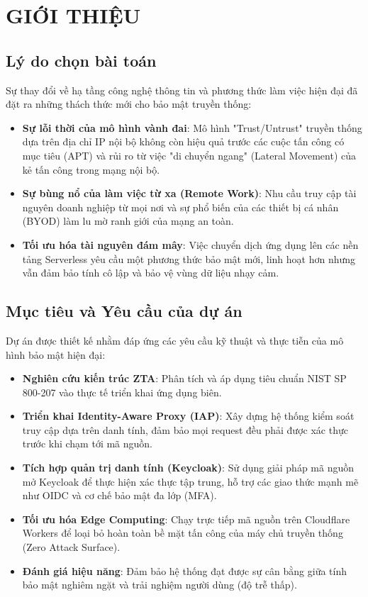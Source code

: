 
\section{GIỚI THIỆU}

\subsection{Lý do chọn bài toán}
Sự thay đổi về hạ tầng công nghệ thông tin và phương thức làm việc hiện đại đã đặt ra những thách thức mới cho bảo mật truyền thống:
\begin{itemize}
\item \textbf{Sự lỗi thời của mô hình vành đai}: Mô hình "Trust/Untrust" truyền thống dựa trên địa chỉ IP nội bộ không còn hiệu quả trước các cuộc tấn công có mục tiêu (APT) và rủi ro từ việc "di chuyển ngang" (Lateral Movement) của kẻ tấn công trong mạng nội bộ.
\item \textbf{Sự bùng nổ của làm việc từ xa (Remote Work)}: Nhu cầu truy cập tài nguyên doanh nghiệp từ mọi nơi và sự phổ biến của các thiết bị cá nhân (BYOD) làm lu mờ ranh giới của mạng an toàn.
\item \textbf{Tối ưu hóa tài nguyên đám mây}: Việc chuyển dịch ứng dụng lên các nền tảng Serverless yêu cầu một phương thức bảo mật mới, linh hoạt hơn nhưng vẫn đảm bảo tính cô lập và bảo vệ vùng dữ liệu nhạy cảm.
\end{itemize}

\subsection{Mục tiêu và Yêu cầu của dự án}
Dự án được thiết kế nhằm đáp ứng các yêu cầu kỹ thuật và thực tiễn của mô hình bảo mật hiện đại:
\begin{itemize}
\item \textbf{Nghiên cứu kiến trúc ZTA}: Phân tích và áp dụng tiêu chuẩn NIST SP 800-207 vào thực tế triển khai ứng dụng biên.
\item \textbf{Triển khai Identity-Aware Proxy (IAP)}: Xây dựng hệ thống kiểm soát truy cập dựa trên danh tính, đảm bảo mọi request đều phải được xác thực trước khi chạm tới mã nguồn.
\item \textbf{Tích hợp quản trị danh tính (Keycloak)}: Sử dụng giải pháp mã nguồn mở Keycloak để thực hiện xác thực tập trung, hỗ trợ các giao thức mạnh mẽ như OIDC và cơ chế bảo mật đa lớp (MFA).
\item \textbf{Tối ưu hóa Edge Computing}: Chạy trực tiếp mã nguồn trên Cloudflare Workers để loại bỏ hoàn toàn bề mặt tấn công của máy chủ truyền thống (Zero Attack Surface).
\item \textbf{Đánh giá hiệu năng}: Đảm bảo hệ thống đạt được sự cân bằng giữa tính bảo mật nghiêm ngặt và trải nghiệm người dùng (độ trễ thấp).
\end{itemize}
\newpage
